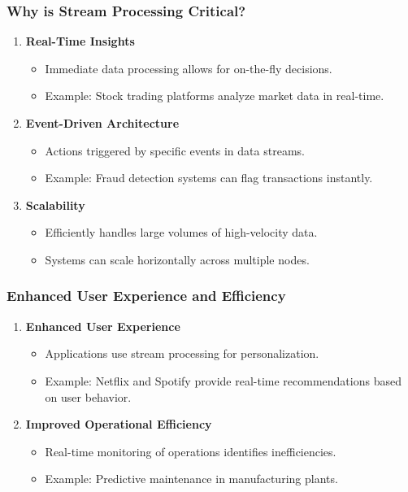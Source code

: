 \documentclass[aspectratio=169]{beamer}
\begin{document}
\begin{frame}[fragile]
    \frametitle{Why is Stream Processing Critical?}
    \begin{enumerate}
        \item \textbf{Real-Time Insights}
            \begin{itemize}
                \item Immediate data processing allows for on-the-fly decisions.
                \item Example: Stock trading platforms analyze market data in real-time.
            \end{itemize}
        
        \item \textbf{Event-Driven Architecture}
            \begin{itemize}
                \item Actions triggered by specific events in data streams.
                \item Example: Fraud detection systems can flag transactions instantly.
            \end{itemize}

        \item \textbf{Scalability}
            \begin{itemize}
                \item Efficiently handles large volumes of high-velocity data.
                \item Systems can scale horizontally across multiple nodes.
            \end{itemize}
    \end{enumerate}
\end{frame}

\begin{frame}[fragile]
    \frametitle{Enhanced User Experience and Efficiency}
    \begin{enumerate}[resume]
        \item \textbf{Enhanced User Experience}
            \begin{itemize}
                \item Applications use stream processing for personalization.
                \item Example: Netflix and Spotify provide real-time recommendations based on user behavior.
            \end{itemize}

        \item \textbf{Improved Operational Efficiency}
            \begin{itemize}
                \item Real-time monitoring of operations identifies inefficiencies.
                \item Example: Predictive maintenance in manufacturing plants.
            \end{itemize}
    \end{enumerate}
\end{frame}
\end{document}
